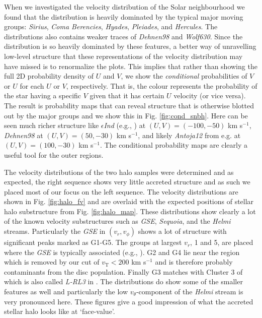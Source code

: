 When we investigated the velocity distribution of the Solar neighbourhood we found that the distribution is heavily dominated by the typical major moving groups: \textit{Sirius}, \textit{Coma Berencies}, \textit{Hyades}, \textit{Pleiades}, and \textit{Hercules}. The distributions also contains weaker traces of \textit{Dehnen98} and \textit{Wolf630}. Since the distribution is so heavily dominated by these features, a better way of  unravelling low-level structure that these representations of the velocity distribution may have missed is to renormalize the plots. This implies that rather than showing the full 2D probability density of $U$ and $V$, we show the \emph{conditional} probabilities of $V$ or $U$ for each $U$ or $V$, respectively. That is, the colour represents the probability of the star having a specific $V$ given that it has certain $U$ velocity (or vice versa). The result is probability maps that can reveal structure that is otherwise blotted out by the major groups and we show this in Fig. \ref{fig:cond_snbh}. Here can be seen much richer structure like $\epsilon$\textit{Ind} (e.g., \citealt{antoja:12, kushniruk:17, bobylev:16}) at $(U, V) = (-100, -50)$ km s$^{-1}$, \textit{Dehnen98} \citep{antoja:12} at $(U, V) = (50, -30)$ km s$^{-1}$, and likely \textit{Antoja12} from e.g. \cite{kushniruk:17} at $(U, V) = (100, -30)$ km s$^{-1}$. The conditional probability maps are clearly a useful tool for the outer regions.

The velocity distributions of the two halo samples were determined and as expected, the right sequence shows very little accreted structure and as such we placed most of our focus on the left sequence. The velocity distributions are shown in Fig. \ref{fig:halo_fv} and are overlaid with the expected positions of stellar halo substructure from Fig. \ref{fig:halo_map}. These distributions show clearly a lot of the known velocity substructures such as \textit{GSE}, \textit{Sequoia}, and the \textit{Helmi} streams. Particularly the \textit{GSE} in $(v_r, v_\phi)$ shows a lot of structure with significant peaks marked as G1-G5. The groups at largest $v_r$, 1 and 5, are placed where the \textit{GSE} is typically associated (e.g., \citealt{feuillet:21}). G2 and G4 lie near the region which is removed by our cut of $v_\mathrm{T} < 200$ km s$^{-1}$ and is therefore probably contaminants from  the disc population. Finally G3 matches with Cluster 3 of \cite{lovdal:22} which is also called \textit{L-RL3} in \cite{dodd:22}. The distributions do show some of the smaller features as well and particularly the low $v_\theta$-component of the \textit{Helmi} stream is very pronounced here. These figures give a good impression of what the accreted stellar halo looks like at `face-value'.


